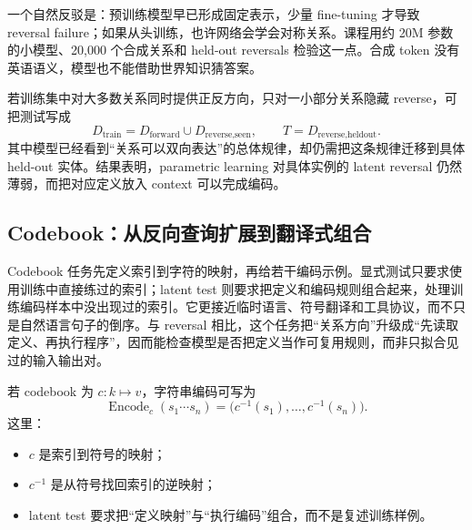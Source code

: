 一个自然反驳是：预训练模型早已形成固定表示，少量 fine-tuning 才导致 reversal failure；如果从头训练，也许网络会学会对称关系。课程用约 20M 参数的小模型、20,000 个合成关系和 held-out reversals 检验这一点。合成 token 没有英语语义，模型也不能借助世界知识猜答案。



若训练集中对大多数关系同时提供正反方向，只对一小部分关系隐藏 reverse，可把测试写成
$$
D_{\text{train}}=D_{\text{forward}}\cup D_{\text{reverse,seen}},
\qquad
T=D_{\text{reverse,heldout}}.
$$
其中模型已经看到“关系可以双向表达”的总体规律，却仍需把这条规律迁移到具体 held-out 实体。结果表明，parametric learning 对具体实例的 latent reversal 仍然薄弱，而把对应定义放入 context 可以完成编码。


\subsection{Codebook：从反向查询扩展到翻译式组合}

Codebook 任务先定义索引到字符的映射，再给若干编码示例。显式测试只要求使用训练中直接练过的索引；latent test 则要求把定义和编码规则组合起来，处理训练编码样本中没出现过的索引。它更接近临时语言、符号翻译和工具协议，而不只是自然语言句子的倒序。与 reversal 相比，这个任务把“关系方向”升级成“先读取定义、再执行程序”，因而能检查模型是否把定义当作可复用规则，而非只拟合见过的输入输出对。


若 codebook 为 $c:k\mapsto v$，字符串编码可写为
$$
\operatorname{Encode}_{c}(s_1\cdots s_n)
=\bigl(c^{-1}(s_1),\ldots,c^{-1}(s_n)\bigr).
$$
这里：
\begin{itemize}
  \item $c$ 是索引到符号的映射；
  \item $c^{-1}$ 是从符号找回索引的逆映射；
  \item latent test 要求把“定义映射”与“执行编码”组合，而不是复述训练样例。
\end{itemize}

